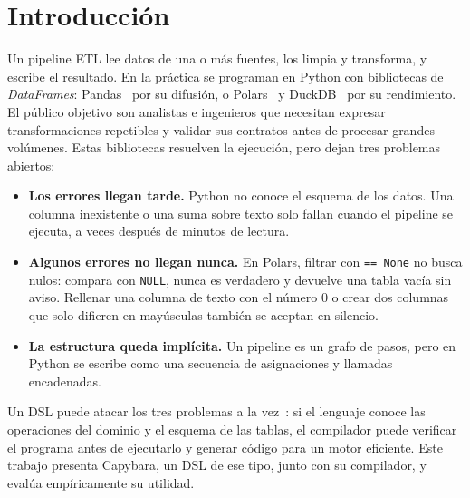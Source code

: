 \documentclass[sigplan,screen,nonacm]{acmart}
\begin{document}
\section{Introducción}

Un pipeline ETL lee datos de una o más fuentes, los limpia y transforma, y escribe el
resultado. En la práctica se programan en Python con bibliotecas de \emph{DataFrames}:
Pandas~\cite{mckinney2010} por su difusión, o Polars~\cite{polars} y DuckDB~\cite{raasveldt2019}
por su rendimiento. El público objetivo son analistas e ingenieros que necesitan expresar transformaciones
repetibles y validar sus contratos antes de procesar grandes volúmenes. Estas bibliotecas
resuelven la ejecución, pero dejan tres problemas abiertos:

\begin{itemize}
  \item \textbf{Los errores llegan tarde.} Python no conoce el esquema de los datos. Una
    columna inexistente o una suma sobre texto solo fallan cuando el pipeline se ejecuta,
    a veces después de minutos de lectura.
  \item \textbf{Algunos errores no llegan nunca.} En Polars, filtrar con
    \texttt{== None} no busca nulos: compara con \texttt{NULL}, nunca es verdadero y
    devuelve una tabla vacía sin aviso. Rellenar una columna de texto con el número 0 o crear dos
    columnas que solo difieren en mayúsculas también se aceptan en silencio.
  \item \textbf{La estructura queda implícita.} Un pipeline es un grafo de pasos, pero en
    Python se escribe como una secuencia de asignaciones y llamadas encadenadas.
\end{itemize}

Un DSL puede atacar los tres problemas a la vez~\cite{mernik2005,vandeursen2000}: si el
lenguaje conoce las operaciones del dominio y el esquema de las tablas, el compilador puede
verificar el programa antes de ejecutarlo y generar código para un motor eficiente. Este
trabajo presenta Capybara, un DSL de ese tipo, junto con su compilador, y evalúa
empíricamente su utilidad.
\end{document}
